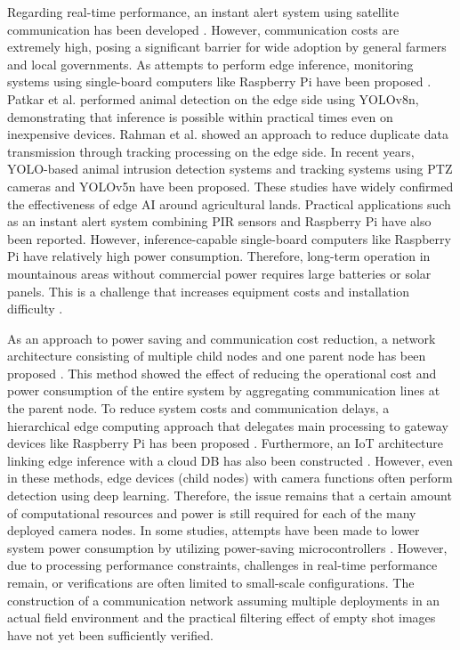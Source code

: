 \documentclass[conference]{IEEEtran}
\begin{document}
Regarding real-time performance, an instant alert system using satellite communication has been developed \cite{Whytock2023}. However, communication costs are extremely high, posing a significant barrier for wide adoption by general farmers and local governments. As attempts to perform edge inference, monitoring systems using single-board computers like Raspberry Pi have been proposed \cite{Patkar2025,Computers2025}. Patkar et al. \cite{Patkar2025} performed animal detection on the edge side using YOLOv8n, demonstrating that inference is possible within practical times even on inexpensive devices. Rahman et al. \cite{Computers2025} showed an approach to reduce duplicate data transmission through tracking processing on the edge side. In recent years, YOLO-based animal intrusion detection systems \cite{10716895,11459678} and tracking systems using PTZ cameras and YOLOv5n \cite{SMC2024} have been proposed. These studies have widely confirmed the effectiveness of edge AI around agricultural lands. Practical applications such as an instant alert system combining PIR sensors and Raspberry Pi \cite{11337723} have also been reported. However, inference-capable single-board computers like Raspberry Pi have relatively high power consumption. Therefore, long-term operation in mountainous areas without commercial power requires large batteries or solar panels. This is a challenge that increases equipment costs and installation difficulty \cite{IEICE2020,Sato2022}.

As an approach to power saving and communication cost reduction, a network architecture consisting of multiple child nodes and one parent node has been proposed \cite{Sato2022}. This method showed the effect of reducing the operational cost and power consumption of the entire system by aggregating communication lines at the parent node. To reduce system costs and communication delays, a hierarchical edge computing approach that delegates main processing to gateway devices like Raspberry Pi has been proposed \cite{8912138}. Furthermore, an IoT architecture linking edge inference with a cloud DB has also been constructed \cite{9345858}. However, even in these methods, edge devices (child nodes) with camera functions often perform detection using deep learning. Therefore, the issue remains that a certain amount of computational resources and power is still required for each of the many deployed camera nodes. In some studies, attempts have been made to lower system power consumption by utilizing power-saving microcontrollers \cite{IEICE2020}. However, due to processing performance constraints, challenges in real-time performance remain, or verifications are often limited to small-scale configurations. The construction of a communication network assuming multiple deployments in an actual field environment and the practical filtering effect of empty shot images have not yet been sufficiently verified.
\end{document}
